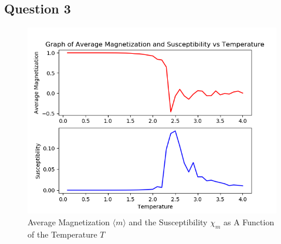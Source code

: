 \documentclass[a4paper]{article}
\numberwithin{equation}{section}
\begin{document}
\subsection{Question 3}
\begin{figure}[H]
	\centering
	\includegraphics[scale=0.7]{mxvst.png}
	\caption{Average Magnetization $\langle m \rangle$ and the Susceptibility $\chi_m$ as A Function of the Temperature $T$}
	\label{fig:mxvst}
\end{figure}
\end{document}
